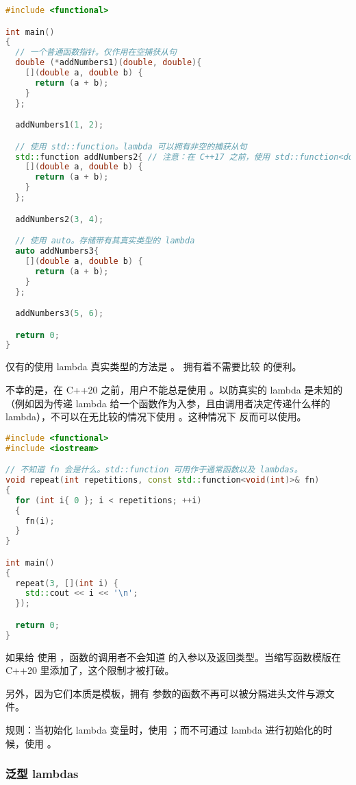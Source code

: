 \documentclass[../../LearnCpp.tex]{subfiles}
\begin{document}
\begin{lstlisting}[language=C++]
#include <functional>

int main()
{
  // 一个普通函数指针。仅作用在空捕获从句
  double (*addNumbers1)(double, double){
    [](double a, double b) {
      return (a + b);
    }
  };

  addNumbers1(1, 2);

  // 使用 std::function。lambda 可以拥有非空的捕获从句
  std::function addNumbers2{ // 注意：在 C++17 之前，使用 std::function<double(double, double)>
    [](double a, double b) {
      return (a + b);
    }
  };

  addNumbers2(3, 4);

  // 使用 auto。存储带有其真实类型的 lambda
  auto addNumbers3{
    [](double a, double b) {
      return (a + b);
    }
  };

  addNumbers3(5, 6);

  return 0;
}
\end{lstlisting}

仅有的使用 lambda 真实类型的方法是 。 拥有着不需要比较  的便利。

不幸的是，在 C++20 之前，用户不能总是使用 。以防真实的 lambda 是未知的（例如因为传递 lambda 给一个函数作为入参，且由调用者决定传递什么样的 lambda），不可以在无比较的情况下使用 。这种情况下  反而可以使用。

\begin{lstlisting}[language=C++]
#include <functional>
#include <iostream>

// 不知道 fn 会是什么。std::function 可用作于通常函数以及 lambdas。
void repeat(int repetitions, const std::function<void(int)>& fn)
{
  for (int i{ 0 }; i < repetitions; ++i)
  {
    fn(i);
  }
}

int main()
{
  repeat(3, [](int i) {
    std::cout << i << '\n';
  });

  return 0;
}
\end{lstlisting}

如果给  使用 ，函数的调用者不会知道  的入参以及返回类型。当缩写函数模版在 C++20 里添加了，这个限制才被打破。

另外，因为它们本质是模板，拥有  参数的函数不再可以被分隔进头文件与源文件。

规则：当初始化 lambda 变量时，使用 ；而不可通过 lambda 进行初始化的时候，使用  。

\subsubsection*{泛型 lambdas}
\end{document}

